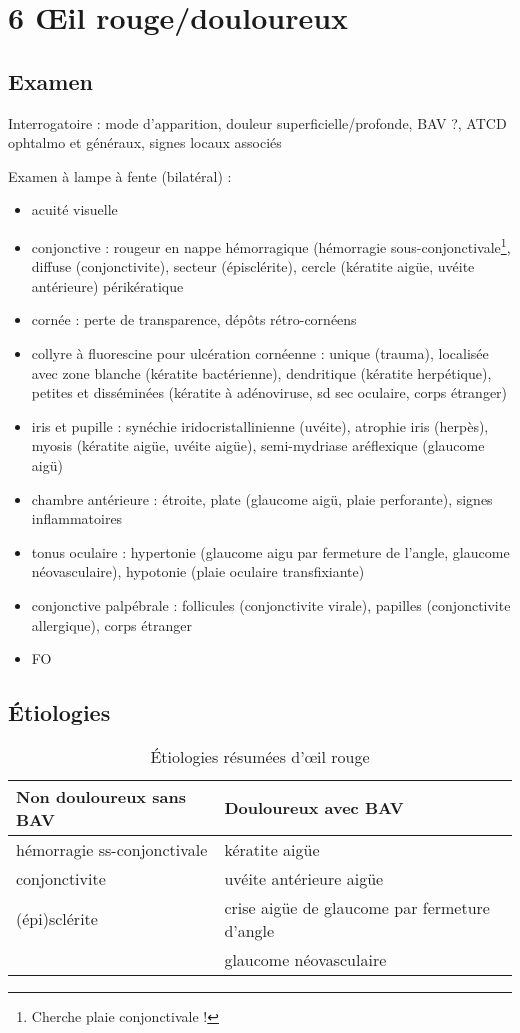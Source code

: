 \documentclass[11pt]{article}
\begin{document}
\section{6 \OE{}il rouge/douloureux}
\label{sec:org9915d84}
\subsection{Examen}
\label{sec:orgfcf183e}
Interrogatoire : mode d'apparition, douleur superficielle/profonde, BAV
   ?, ATCD ophtalmo et généraux, signes locaux associés

Examen à lampe à fente (bilatéral) :
\begin{itemize}
\item acuité visuelle
\item conjonctive : rougeur en nappe hémorragique (hémorragie
sous-conjonctivale\footnote{Cherche plaie conjonctivale !}, diffuse (conjonctivite), secteur (épisclérite),
cercle (kératite aigüe, uvéite antérieure)
périkératique
\item cornée : perte de transparence, dépôts rétro-cornéens
\item collyre à fluorescine pour ulcération cornéenne : unique (trauma), localisée
avec zone blanche (kératite bactérienne), dendritique (kératite herpétique),
petites et disséminées (kératite à adénoviruse, sd sec oculaire, corps
étranger)
\item iris et pupille : synéchie iridocristallinienne (uvéite), atrophie iris
(herpès), myosis (kératite aigüe, uvéite aigüe), semi-mydriase
aréflexique (glaucome aigü)
\item chambre antérieure : étroite, plate (glaucome aigü, plaie perforante), signes inflammatoires
\item tonus oculaire : hypertonie (glaucome aigu par fermeture de l'angle, glaucome
néovasculaire), hypotonie (plaie oculaire transfixiante)
\item conjonctive palpébrale : follicules (conjonctivite virale), papilles
(conjonctivite allergique), corps étranger
\item FO
\end{itemize}

\subsection{Étiologies}
\label{sec:org382f7ba}

\begin{table}[htbp]
\caption{Étiologies résumées d'\oe{}il rouge}
\centering
\begin{tabular}{ll}
\toprule
Non douloureux sans BAV & Douloureux avec BAV\\
\midrule
hémorragie ss-conjonctivale & kératite aigüe\\
conjonctivite & uvéite antérieure aigüe\\
(épi)sclérite & crise aigüe de glaucome par fermeture d'angle\\
 & glaucome néovasculaire\\
\bottomrule
\end{tabular}
\end{table}
\end{document}
